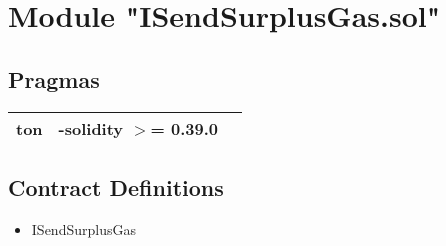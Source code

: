 
\section{Module "ISendSurplusGas.sol"}


\subsection{Pragmas}


\noindent\begin{tabular}{|l|l|p{5cm}|}\hline
ton & -solidity $>$= 0.39.0 &\\\hline
\end{tabular}


\subsection{Contract Definitions}

\begin{itemize}
\item ISendSurplusGas
\end{itemize}
